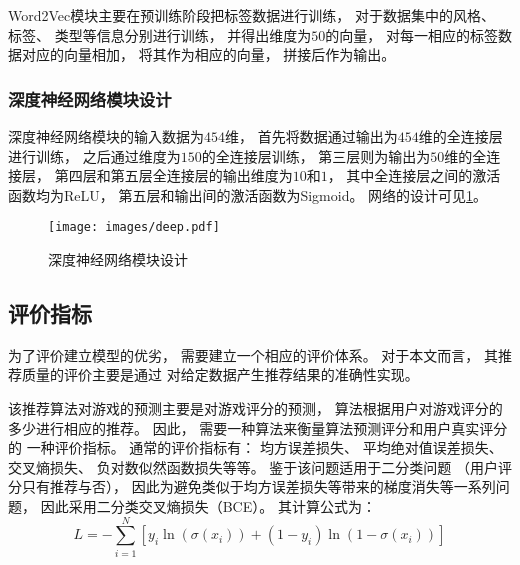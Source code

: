 Word2Vec模块主要在预训练阶段把标签数据进行训练，
对于数据集中的风格、
标签、
类型等信息分别进行训练，
并得出维度为$50$的向量，
对每一相应的标签数据对应的向量相加，
将其作为相应的向量，
拼接后作为输出。

\subsubsection{深度神经网络模块设计}

深度神经网络模块的输入数据为$454$维，
首先将数据通过输出为$454$维的全连接层进行训练，
之后通过维度为$150$的全连接层训练，
第三层则为输出为$50$维的全连接层，
第四层和第五层全连接层的输出维度为$10$和$1$，
其中全连接层之间的激活函数均为ReLU，
第五层和输出间的激活函数为Sigmoid。
网络的设计可见\cref{fig:deep}。

\begin{figure}[!htbp]
	\centering
	\texttt{[image: images/deep.pdf]}
	\caption{深度神经网络模块设计}\label{fig:deep}
\end{figure}

\subsection{评价指标}

为了评价建立模型的优劣，
需要建立一个相应的评价体系。
对于本文而言，
其推荐质量的评价主要是通过
对给定数据产生推荐结果的准确性实现。

该推荐算法对游戏的预测主要是对游戏评分的预测，
算法根据用户对游戏评分的多少进行相应的推荐。
因此，
需要一种算法来衡量算法预测评分和用户真实评分的
一种评价指标。
通常的评价指标有：
均方误差损失、
平均绝对值误差损失、
交叉熵损失、
负对数似然函数损失等等。
鉴于该问题适用于二分类问题
（用户评分只有推荐与否），
因此为避免类似于均方误差损失等带来的梯度消失等一系列问题，
因此采用二分类交叉熵损失（BCE）。
其计算公式为：
\begin{equation}
	L=-\sum_{i=1}^{N}\left[y_{i} \ln \left(\sigma\left(x_{i}\right)\right)+\left(1-y_{i}\right) \ln \left(1-\sigma\left(x_{i}\right)\right)\right]
\end{equation}

